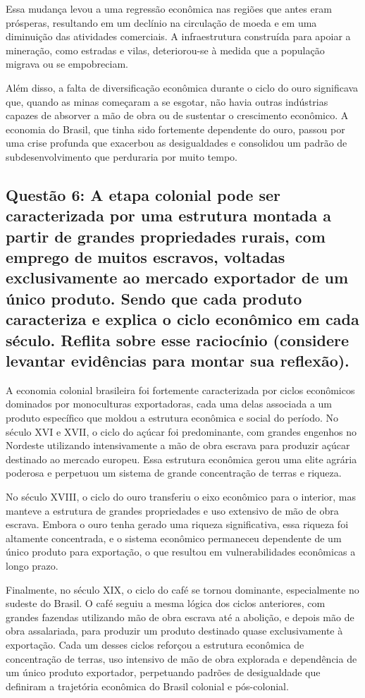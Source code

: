 \documentclass[a4paper,12pt]{article}[abntex2]
\begin{document}
Essa mudança levou a uma regressão econômica nas regiões que antes eram prósperas, resultando em um declínio na circulação de moeda e em uma diminuição das atividades comerciais. A infraestrutura construída para apoiar a mineração, como estradas e vilas, deteriorou-se à medida que a população migrava ou se empobreciam.

Além disso, a falta de diversificação econômica durante o ciclo do ouro significava que, quando as minas começaram a se esgotar, não havia outras indústrias capazes de absorver a mão de obra ou de sustentar o crescimento econômico. A economia do Brasil, que tinha sido fortemente dependente do ouro, passou por uma crise profunda que exacerbou as desigualdades e consolidou um padrão de subdesenvolvimento que perduraria por muito tempo.

\subsection{\textbf{Questão 6: A etapa colonial pode ser caracterizada por uma estrutura montada a partir de grandes propriedades rurais, com emprego de muitos escravos, voltadas exclusivamente ao mercado exportador de um único produto. Sendo que cada produto caracteriza e explica o ciclo econômico em cada século. Reflita sobre esse raciocínio (considere levantar evidências para montar sua reflexão).}}

A economia colonial brasileira foi fortemente caracterizada por ciclos econômicos dominados por monoculturas exportadoras, cada uma delas associada a um produto específico que moldou a estrutura econômica e social do período. No século XVI e XVII, o ciclo do açúcar foi predominante, com grandes engenhos no Nordeste utilizando intensivamente a mão de obra escrava para produzir açúcar destinado ao mercado europeu. Essa estrutura econômica gerou uma elite agrária poderosa e perpetuou um sistema de grande concentração de terras e riqueza.

No século XVIII, o ciclo do ouro transferiu o eixo econômico para o interior, mas manteve a estrutura de grandes propriedades e uso extensivo de mão de obra escrava. Embora o ouro tenha gerado uma riqueza significativa, essa riqueza foi altamente concentrada, e o sistema econômico permaneceu dependente de um único produto para exportação, o que resultou em vulnerabilidades econômicas a longo prazo.

Finalmente, no século XIX, o ciclo do café se tornou dominante, especialmente no sudeste do Brasil. O café seguiu a mesma lógica dos ciclos anteriores, com grandes fazendas utilizando mão de obra escrava até a abolição, e depois mão de obra assalariada, para produzir um produto destinado quase exclusivamente à exportação. Cada um desses ciclos reforçou a estrutura econômica de concentração de terras, uso intensivo de mão de obra explorada e dependência de um único produto exportador, perpetuando padrões de desigualdade que definiram a trajetória econômica do Brasil colonial e pós-colonial.
\end{document}
